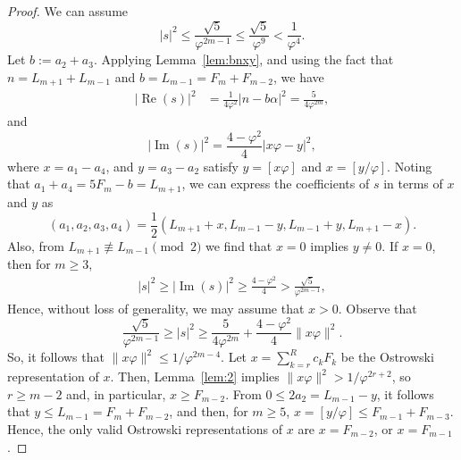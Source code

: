 \documentclass[10pt,a4paper]{amsart}
\DeclareMathOperator{\im}{Im}
\DeclareMathOperator{\re}{Re}
\newcommand{\ph}{\varphi}
\begin{document}
\begin{proof}
We can assume
  \[|s|^2\leq \frac{\sqrt{5}}{\ph^{2m-1}}\leq \frac{\sqrt{5}}{\ph^9}<\frac{1}{\ph^4}.\]
  Let $b:=a_2+a_3$. Applying Lemma~\ref{lem:bnxy}, and using the fact that $n=L_{m+1}+L_{m-1}$ and $b=L_{m-1}=F_{m}+F_{m-2}$, we have
  \begin{align*}
    |\re(s)|^2 &= \frac{1}{4\ph^2}|n-b\alpha|^2=\frac{5}{4\ph^{2m}},
  \end{align*}
  and
  \[|\im(s)|^2=\frac{4-\ph^2}{4}|x\ph-y|^2,\]
  where $x=a_1-a_4$, and $y=a_3-a_2$ satisfy $y=[x\ph]$ and $x=[y/\ph]$. Noting that $a_1+a_4=5F_{m}-b=L_{m+1}$, we can express the coefficients of $s$ in terms of $x$ and $y$ as
  \[(a_1,a_2,a_3,a_4)=\frac{1}{2}(L_{m+1}+x,L_{m-1}-y,L_{m-1}+y,L_{m+1}-x).\]
   Also, from $L_{m+1}\not\equiv L_{m-1}\pmod{2}$ we find that $x=0$ implies $y\neq 0$. If $x=0$, then for $m\geq 3$,
  \begin{align*}
    |s|^2\geq |\im(s)|^2\geq\frac{4-\ph^2}{4}>\frac{\sqrt{5}}{\ph^{2m-1}},
  \end{align*}
 Hence, without loss of generality, we may assume that $x>0$. Observe that
 \[\frac{\sqrt{5}}{\ph^{2m-1}}\geq |s|^2\geq \frac{5}{4\ph^{2m}}+\frac{4-\ph^2}{4}\|x\ph\|^2.\]
 So, it follows that $\|x\ph\|^2\leq 1/\ph^{2m-4}$. Let $x=\sum_{k=r}^R c_{k}F_{k}$ be the Ostrowski representation of $x$. Then, Lemma~\ref{lem:2} implies $\|x\ph\|^2>1/\ph^{2r+2}$, so $r\geq m-2$ and, in particular, $x\geq F_{m-2}$. From $0\leq 2a_2=L_{m-1}-y$, it follows that $y\leq L_{m-1}=F_{m}+F_{m-2}$, and then, for $m\geq 5$, $x=[y/\ph]\leq F_{m-1}+F_{m-3}$. Hence, the only valid Ostrowski representations of $x$ are $x= F_{m-2}$, or $x=F_{m-1}$. 
  

\end{proof}
\end{document}
